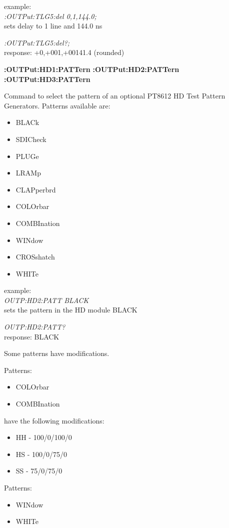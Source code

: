 example:\\
\textit{:OUTPut:TLG5:del 0,1,144.0;}\\
sets delay to 1 line and 144.0 ns

\textit{:OUTPut:TLG5:del?;}\\
response: +0,+001,+00141.4 (rounded)

\textbf{:OUTPut:HD1:PATTern}
\textbf{:OUTPut:HD2:PATTern}
\textbf{:OUTPut:HD3:PATTern}

Command to select the pattern of an optional PT8612 HD Test Pattern Generators. Patterns available are:
 
\begin{itemize}
\item BLACk
\item SDICheck
\item PLUGe
\item LRAMp
\item CLAPperbrd
\item COLOrbar
\item COMBInation
\item WINdow
\item CROSshatch
\item WHITe
\end{itemize}

example:\\
\textit{OUTP:HD2:PATT BLACK}\\
sets the pattern in the HD module BLACK

\textit{OUTP:HD2:PATT?}\\
response: BLACK

Some patterns have modifications.

Patterns:

\begin{itemize}
\item COLOrbar
\item COMBInation
\end{itemize}

have the following modifications:

\begin{itemize}
\item HH  - 100/0/100/0
\item HS  - 100/0/75/0
\item SS  - 75/0/75/0
\end{itemize}

Patterns:

\begin{itemize}
\item WINdow
\item WHITe
\end{itemize}

